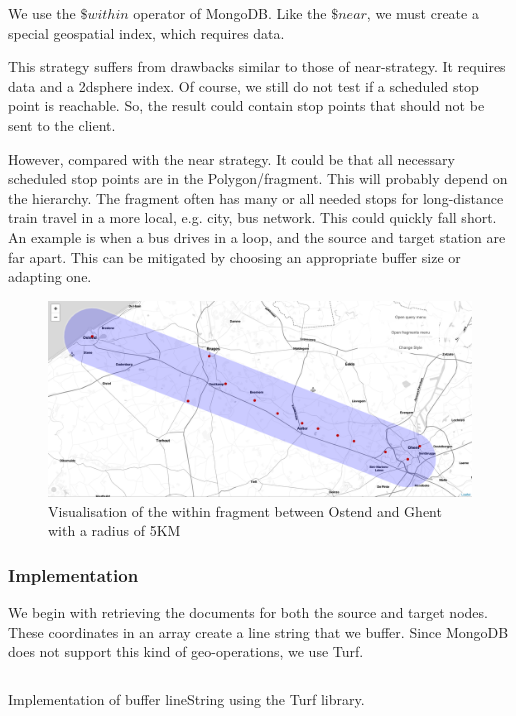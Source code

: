 We use the $\$within$ \cite{noauthor_geowithin_nodate} operator of MongoDB. Like the $\$near$, we must create a special geospatial index, which requires  data.

This strategy suffers from drawbacks similar to those of near-strategy. It requires  data and a 2dsphere index. Of course, we still do not test if a scheduled stop point is reachable. So, the result could contain stop points that should not be sent to the client. 

However, compared with the near strategy. It could be that all necessary scheduled stop points are in the Polygon/fragment. This will probably depend on the hierarchy. The fragment often has many or all needed stops for long-distance train travel in a more local, e.g. city, bus network. This could quickly fall short. An example is when a bus drives in a loop, and the source and target station are far apart. This can be mitigated by choosing an appropriate buffer size or adapting one.

\begin{figure}[H]
    \centering
    \includegraphics[width=\textwidth]{images/within visualized.png}
    \caption{Visualisation of the within fragment between Ostend and Ghent with a radius of 5KM}
    \label{fig:within-visualized}
\end{figure}

\subsubsection{Implementation}
We begin with retrieving the documents for both the source and target nodes. These coordinates in an array create a line string that we buffer. Since MongoDB does not support this kind of geo-operations, we use Turf\cite{noauthor_turfjs_nodate}.

\begin{listing}[H]
    \inputminted[linenos,frame=single,breaklines]{TypeScript}{code/turf.ts}
    \caption{Implementation of buffer lineString using the Turf library.}
\end{listing}

